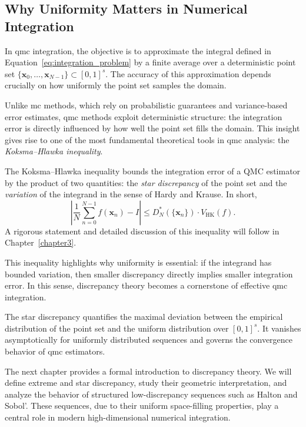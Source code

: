 \subsection{Why Uniformity Matters in Numerical Integration}

In \ac{qmc} integration, the objective is to approximate the integral defined in
Equation~\eqref{eq:integration_problem} by a finite average over a deterministic
point set $\{\boldsymbol{x}_0, \dots, \boldsymbol{x}_{N-1}\} \subset [0,1]^s$.
The accuracy of this approximation depends crucially on how uniformly the point
set samples the domain.

Unlike \ac{mc} methods, which rely on probabilistic guarantees and
variance-based error estimates, \ac{qmc} methods exploit deterministic
structure: the integration error is directly influenced by how well the point
set fills the domain. This insight gives rise to one of the most fundamental
theoretical tools in \ac{qmc} analysis: the \emph{Koksma--Hlawka inequality}.

\begin{remark}
The Koksma--Hlawka inequality bounds the integration error of a QMC estimator by
the product of two quantities: the \emph{star discrepancy} of the point set and
the \emph{variation} of the integrand in the sense of Hardy and Krause. In
short,
\begin{equation*}
    \left| \frac{1}{N} \sum_{n=0}^{N-1} f(\boldsymbol{x}_n) - I \right| 
    \leq D_N^*(\{\boldsymbol{x}_n\}) \cdot V_{\mathrm{HK}}(f).
\end{equation*}
A rigorous statement and detailed discussion of this inequality will follow in
Chapter~\ref{chapter3}.
\end{remark}

This inequality highlights why uniformity is essential: if the integrand has
bounded variation, then smaller discrepancy directly implies smaller integration
error. In this sense, discrepancy theory becomes a cornerstone of effective
\ac{qmc} integration.

\begin{remark}
The star discrepancy quantifies the maximal deviation between the empirical
distribution of the point set and the uniform distribution over $[0,1]^s$. It
vanishes asymptotically for uniformly distributed sequences and governs the
convergence behavior of \ac{qmc} estimators.
\end{remark}

The next chapter provides a formal introduction to discrepancy theory. We will
define extreme and star discrepancy, study their geometric interpretation, and
analyze the behavior of structured low-discrepancy sequences such as Halton and
Sobol'. These sequences, due to their uniform space-filling properties, play a
central role in modern high-dimensional numerical integration.
